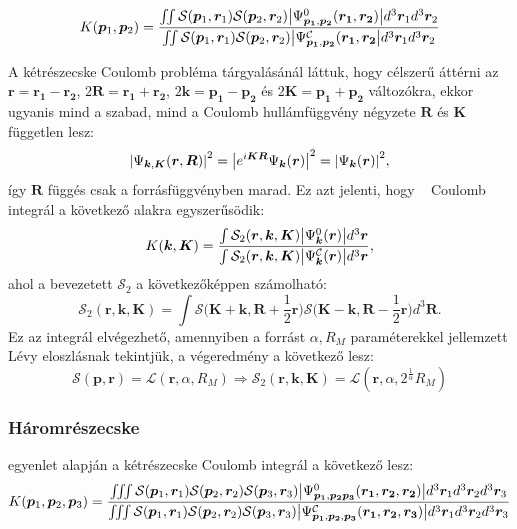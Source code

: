\documentclass[11pt,a4paper]{article}
\numberwithin{equation}{subsection}
\numberwithin{figure}{section}
\begin{document}
\begin{equation}
K(\bm{p}_1,\bm{p}_2)=
\frac{
\iint \mathcal{S}(\bm{p}_1, \bm{r}_1)\mathcal{S}(\bm{p}_2, \bm{r}_2)
\abs{\Psi^{0}_{\bm{p_1},\bm{p_2}}(\bm{r_1},\bm{r_2})} d^3 \bm{r}_1d^3 \bm{r}_2
}{\iint \mathcal{S}(\bm{p}_1, \bm{r}_1)\mathcal{S}(\bm{p}_2, \bm{r}_2)
\abs{\Psi^\mathcal{C}_{\bm{p_1},\bm{p_2}}(\bm{r_1},\bm{r_2}}d^3 \bm{r}_1d^3 \bm{r}_2}
\label{eq:Kn2}
\end{equation}

A kétrészecske Coulomb probléma tárgyalásánál láttuk, hogy célszerű áttérni az $\bm{r}=\bm{r_1}-\bm{r_2}$, $2\bm{R}=\bm{r_1}+\bm{r_2}$, $2\bm{k}=\bm{p_1}-\bm{p_2}$ és $2\bm{K}=\bm{p_1}+\bm{p_2}$ változókra, ekkor ugyanis mind a szabad, mind a Coulomb hullámfüggvény négyzete $\bm{R}$ és  $\bm{K}$ független lesz:
\begin{equation}
\abs{\Psi_{\bm{k},\bm{K}}(\bm{r},\bm{R})}^2 = \abs{e^{i\bm{KR}}\Psi_{\bm{k}}(\bm{r})}^2=\abs{\Psi_{\bm{k}}(\bm{r})}^2,
\end{equation}
így $\bm{R}$ függés csak a forrásfüggvényben marad. Ez azt jelenti, hogy ~ Coulomb integrál a következő alakra egyszerűsödik:
\begin{equation}
K(\bm{k},\bm{K})=
\frac{
\int \mathcal{S}_2(\bm{r}, \bm{k}, \bm{K})
\abs{\Psi^{0}_{\bm{k}}(\bm{r})} d^3 \bm{r}
}{\int \mathcal{S}_2(\bm{r}, \bm{k}, \bm{K})
\abs{\Psi^{\mathcal{C}}_{\bm{k}}(\bm{r})} d^3 \bm{r}},
\label{eq:K2}
\end{equation}
ahol a bevezetett $\mathcal{S}_2$ a következőképpen számolható:
\begin{equation}
\mathcal{S}_2(\bm{r}, \bm{k},\bm{K}) = \int \mathcal{S}\Big(\bm{K}+\bm{k}, \bm{R}+\frac{1}{2}\bm{r}\Big)\mathcal{S}\Big(\bm{K}-\bm{k}, \bm{R}-\frac{1}{2}\bm{r}\Big)d^3\bm{R}.
\end{equation}
Ez az integrál elvégezhető, amennyiben a forrást $\alpha, R_M$ paraméterekkel jellemzett Lévy eloszlásnak tekintjük, a végeredmény a következő lesz:
\begin{equation}
\mathcal{S}(\bm{p},\bm{r})=\mathcal{L}(\bm{r},\alpha,R_M)\Longrightarrow \mathcal{S}_2(\bm{r},\bm{k},\bm{K})=\mathcal{L}(\bm{r}, \alpha, 2^{\frac{1}{\alpha}}R_M)
\end{equation}
\subsubsection{Háromrészecske}
 egyenlet alapján a kétrészecske Coulomb integrál a következő lesz:
\begin{equation}
K(\bm{p}_1,\bm{p}_2,\bm{p}_3)=
\frac{
\iiint 
\mathcal{S}(\bm{p}_1, \bm{r}_1)\mathcal{S}(\bm{p}_2, \bm{r}_2)\mathcal{S}(\bm{p}_3, \bm{r}_3)
\abs{\Psi^{0}_{\bm{p_1},\bm{p_2}\bm{p_3}}(\bm{r_1},\bm{r_2},\bm{r_2})} d^3 \bm{r}_1d^3 \bm{r}_2d^3 \bm{r}_3
}{\iiint
\mathcal{S}(\bm{p}_1, \bm{r}_1)\mathcal{S}(\bm{p}_2, \bm{r}_2)\mathcal{S}(\bm{p}_3, \bm{r}_3)
\abs{\Psi^\mathcal{C}_{\bm{p_1},\bm{p_2},\bm{p_3}}(\bm{r_1},\bm{r_2},\bm{r_3})}d^3 \bm{r}_1d^3 \bm{r}_2d^3 \bm{r}_3}
\label{eq:Kn3}
\end{equation}
\end{document}
